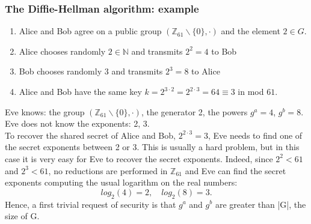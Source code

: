 \documentclass[a4paper, 10pt, titlepage]{article}
\begin{document}
\subsubsection*{The Diffie-Hellman algorithm: example}
\begin{enumerate}
\item Alice and Bob agree on a public group $(\mathbb{Z}_{61} \backslash \{0\}, \cdot)$ and the element $2 \in G$.
\item Alice chooses randomly $2 \in \mathbb{N}$ and transmits $2^2 = 4$ to Bob
\item Bob chooses randomly $3$ and transmits $2^3 = 8$ to Alice
\item Alice and Bob have the same key $k = 2^{3\cdot2} = 2^{2\cdot3} = 64 \equiv 3$ in mod $61$.
\end{enumerate}
Eve knows: the group $(\mathbb{Z}_{61} \backslash \{0\}, \cdot)$, the generator 2, the powers $g^a = 4$, $g^b = 8$.\\
Eve does not know the exponents: 2, 3. \\
To recover the shared secret of Alice and Bob, $2^{2\cdot3} = 3$, Eve needs to find one of the secret exponents between 2 or 3. This is usually a hard problem, but in this case it is very easy for Eve to
recover the secret exponents. Indeed, since $2^2 < 61$ and $2^3 < 61$, no reductions are performed in $\mathbb{Z}_{61}$ and Eve can find the secret exponents computing the usual logarithm on the real numbers:
$$log_2(4) = 2, \quad log_2(8) = 3.$$
Hence, a first trivial request of security is that $g^a$ and $g^b$ are greater than |G|, the size of G.
\end{document}
